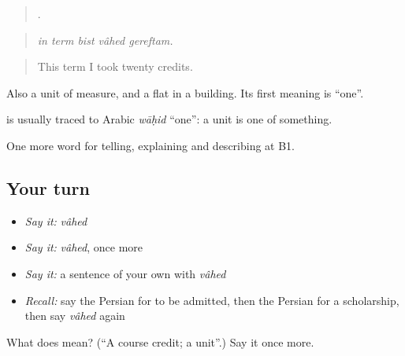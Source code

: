 \begin{quote}
    .
\end{quote}

\begin{quote}
\emph{in term bist vâhed gereftam.}
\end{quote}

\begin{quote}
This term I took twenty credits.
\end{quote}

Also a unit of measure, and a flat in a building. Its first meaning is \textquotedblleft{}one\textquotedblright{}.

\begin{cousinweb}
\textbf{} is usually traced to Arabic \emph{wāḥid} \textquotedblleft{}one\textquotedblright{}: a unit is one of something.
\end{cousinweb}

\begin{grammarlens}[title={What you've built}]
One more word for telling, explaining and describing at B1.
\end{grammarlens}

\subsection*{Your turn}
\begin{itemize}
\raggedright
  \item \emph{Say it:} \emph{vâhed}
  \item \emph{Say it:} \emph{vâhed}, once more
  \item \emph{Say it:} a sentence of your own with \emph{vâhed}
  \item \emph{Recall:} say the Persian for to be admitted, then the Persian for a scholarship, then say \emph{vâhed} again
\end{itemize}

\begin{tcolorbox}[breakable,colback=teal!4,colframe=teal!35!black,title={Before you move on}]
What does  mean? (\textquotedblleft{}A course credit; a unit\textquotedblright{}.) Say it once more.
\end{tcolorbox}
